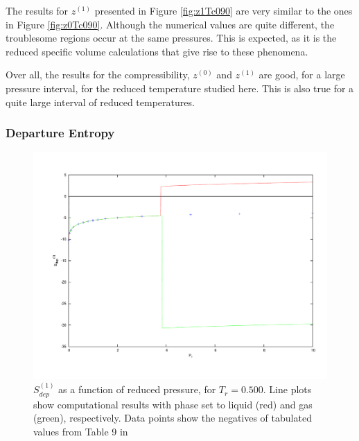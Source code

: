 \documentclass[internal,english]{sintefmemo2012}
\numberwithin{equation}{section}
\begin{document}
The results for $z^{(1)}$ presented in Figure \ref{fig:z1Tc090} are very similar to the ones in Figure \ref{fig:z0Tc090}. Although the numerical values are quite different, the troublesome regions occur at the same pressures. This is expected, as it is the reduced specific volume calculations that give rise to these phenomena. 

Over all, the results for the compressibility, $z^{(0)}$ and $z^{(1)}$ are good, for a large pressure interval, for the reduced temperature studied here. This is also true for a quite large interval of reduced temperatures. 

\subsubsection*{Departure Entropy}
\begin{figure}
	\centering
	\includegraphics[trim = 1.5cm 2cm 0 1cm, clip = true, width=14cm]{Sdep0Tc050}
	\caption{$S_{dep}^{(1)}$ as a function of reduced pressure, for $T_r = 0.500$. Line plots show computational results with phase set to liquid (red) and gas (green), respectively. Data points show the negatives of tabulated values from Table 9 in \cite{LK}}
	\label{fig:Sdep0Tc050}
\end{figure}
\end{document}
